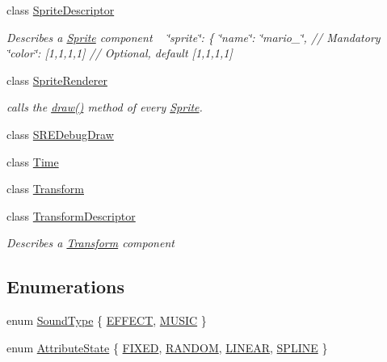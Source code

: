 \begin{DoxyCompactItemize}
class \hyperlink{class_mason_1_1_sprite_descriptor}{Sprite\+Descriptor}
\begin{DoxyCompactList}\small\item\em Describes a \hyperlink{class_mason_1_1_sprite}{Sprite} component ~\newline
 \char`\"{}sprite\char`\"{}\+: \{ \char`\"{}name\char`\"{}\+: \char`\"{}mario\+\_\char`\"{}, // Mandatory ~\newline
 \char`\"{}color\char`\"{}\+: \mbox{[}1,1,1,1\mbox{]} // Optional, default \mbox{[}1,1,1,1\mbox{]} ~\newline
 \end{DoxyCompactList}\item 
class \hyperlink{class_mason_1_1_sprite_renderer}{Sprite\+Renderer}
\begin{DoxyCompactList}\small\item\em calls the \hyperlink{class_mason_1_1_sprite_renderer_aeeeaa7eb5c340b7c2abad3d4785fd1e1}{draw()} method of every \hyperlink{class_mason_1_1_sprite}{Sprite}. \end{DoxyCompactList}\item 
class \hyperlink{class_mason_1_1_s_r_e_debug_draw}{S\+R\+E\+Debug\+Draw}
\item 
class \hyperlink{class_mason_1_1_time}{Time}
\item 
class \hyperlink{class_mason_1_1_transform}{Transform}
\item 
class \hyperlink{class_mason_1_1_transform_descriptor}{Transform\+Descriptor}
\begin{DoxyCompactList}\small\item\em Describes a \hyperlink{class_mason_1_1_transform}{Transform} component ~\newline
 \end{DoxyCompactList}\end{DoxyCompactItemize}
\subsection*{Enumerations}
\begin{DoxyCompactItemize}
\item 
enum \hyperlink{namespace_mason_a158d651086d1ba1aacc4c37125b27657}{Sound\+Type} \{ \hyperlink{namespace_mason_a158d651086d1ba1aacc4c37125b27657a3ee843ce73fc06de504eb1480c65c82f}{E\+F\+F\+E\+CT}, 
\hyperlink{namespace_mason_a158d651086d1ba1aacc4c37125b27657aed96b5a2149aa99cd63db202531798a2}{M\+U\+S\+IC}
 \}
\item 
enum \hyperlink{namespace_mason_aefc2ce7d9295b57af46ab6c8ebfc32f7}{Attribute\+State} \{ \hyperlink{namespace_mason_aefc2ce7d9295b57af46ab6c8ebfc32f7a9f895fa38383fdd4d8ff3a0e62f6829a}{F\+I\+X\+ED}, 
\hyperlink{namespace_mason_aefc2ce7d9295b57af46ab6c8ebfc32f7a7ffd1f43455324cb476f193c685042cc}{R\+A\+N\+D\+OM}, 
\hyperlink{namespace_mason_aefc2ce7d9295b57af46ab6c8ebfc32f7adc1ccb7eb1ce06e416232c706f0b3e93}{L\+I\+N\+E\+AR}, 
\hyperlink{namespace_mason_aefc2ce7d9295b57af46ab6c8ebfc32f7a279e070d018a6126a336f0f28185ecdf}{S\+P\+L\+I\+NE}
 \}
\end{DoxyCompactItemize}


